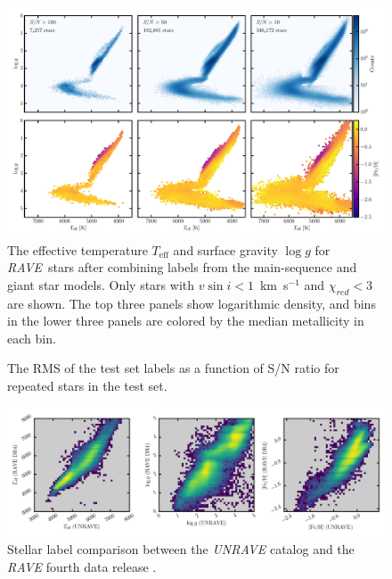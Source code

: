 \documentclass[preprint,trackchanges]{aastex}
\newcommand{\acronym}[1]{{\small{#1}}}
\newcommand{\project}[1]{\textsl{#1}}
\newcommand{\rave}{\project{\acronym{RAVE}}}
\newcommand{\teff}{T_{\mathrm{eff}}}
\newcommand{\logg}{\log g}
\begin{document}
\begin{figure}[p]
\includegraphics[width=\textwidth]{figures/hrd-test-set.pdf}
\caption{The effective temperature $\teff$ and surface gravity $\logg$ for \rave\ stars after combining labels from the main-sequence and giant star models.  Only stars with $v\sin{i} < 1$~km~s$^{-1}$ and $\chi_{red} < 3$ are shown.  The top three panels show logarithmic density, and bins in the lower three panels are colored by the median metallicity in each bin.\label{fig:test-set-hrd}}
\end{figure}






\begin{figure}[p]
\caption{The RMS of the test set labels as a function of S/N ratio for repeated stars in the test set.\label{fig:test-set-repeats}}
\end{figure}

\begin{figure}[p]
\includegraphics[width=\textwidth]{figures/dr4-comparison.png}
\caption{Stellar label comparison between the \project{UNRAVE} catalog and the \project{RAVE} fourth data release \citep{Kordopatis_2013}.\label{fig:rave-dr4-comparison}}
\end{figure}
\end{document}
